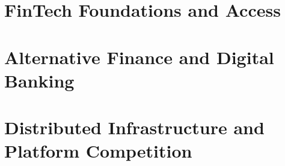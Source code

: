 \documentclass[11pt,oneside,a4paper]{report}
\begin{document}
\hypersetup{pageanchor=false}



\cleardoublepage
{}
\setcounter{tocdepth}{0}
\begingroup
\small
\setlength{\parskip}{0pt}
\tableofcontents
\endgroup
\newpage
\hypersetup{pageanchor=true}



\cleardoublepage
{}

\part{FinTech Foundations and Access}



\part{Alternative Finance and Digital Banking}




\part{Distributed Infrastructure and Platform Competition}





\end{document}
